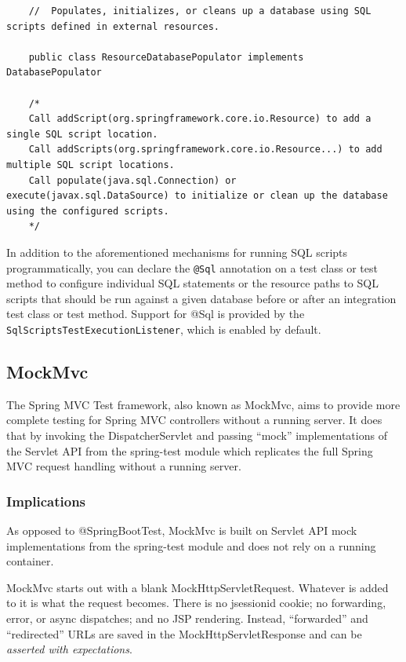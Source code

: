 \documentclass{scrartcl}
\begin{document}
\begin{lstlisting}
    //  Populates, initializes, or cleans up a database using SQL scripts defined in external resources.

    public class ResourceDatabasePopulator implements DatabasePopulator

    /*
    Call addScript(org.springframework.core.io.Resource) to add a single SQL script location.
    Call addScripts(org.springframework.core.io.Resource...) to add multiple SQL script locations.
    Call populate(java.sql.Connection) or execute(javax.sql.DataSource) to initialize or clean up the database using the configured scripts.
    */

\end{lstlisting}

In addition to the aforementioned mechanisms for running SQL scripts programmatically, you can declare the \lstinline|@Sql| annotation on a test class or test method to configure individual SQL statements or the resource paths to SQL scripts that should be run against a given database before or after an integration test class or test method. Support for @Sql is provided by the \lstinline|SqlScriptsTestExecutionListener|, which is enabled by default.

\subsection{MockMvc}

The Spring MVC Test framework, also known as MockMvc, aims to provide more complete testing for Spring MVC controllers without a running server. It does that by invoking the DispatcherServlet and passing “mock” implementations of the Servlet API from the spring-test module which replicates the full Spring MVC request handling without a running server.

\subsubsection{Implications}

As opposed to @SpringBootTest, MockMvc is built on Servlet API mock implementations from the spring-test module and does not rely on a running container.

MockMvc starts out with a blank MockHttpServletRequest. Whatever is added to it is what the request becomes. There is no jsessionid cookie; no forwarding, error, or async dispatches; and no JSP rendering. Instead, “forwarded” and “redirected” URLs are saved in the MockHttpServletResponse and can be \textit{asserted with expectations}.
\end{document}
